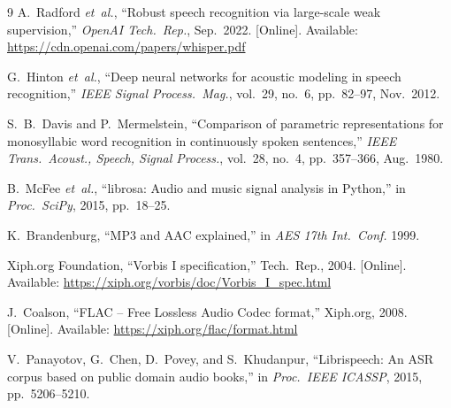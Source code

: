 \documentclass[twocolumn,10pt,a4paper]{article}
\begin{document}
\begin{thebibliography}{9}
A.~Radford \emph{et~al.}, ``Robust speech recognition via large-scale
weak supervision,'' \emph{OpenAI Tech.\ Rep.}, Sep.\ 2022.
[Online]. Available: \url{https://cdn.openai.com/papers/whisper.pdf}

G.~Hinton \emph{et~al.}, ``Deep neural networks for acoustic modeling in
speech recognition,'' \emph{IEEE Signal Process.\ Mag.}, vol.~29,
no.~6, pp.~82--97, Nov.\ 2012.

S.~B.~Davis and P.~Mermelstein, ``Comparison of parametric
representations for monosyllabic word recognition in continuously
spoken sentences,'' \emph{IEEE Trans.\ Acoust., Speech, Signal
Process.}, vol.~28, no.~4, pp.~357--366, Aug.\ 1980.

B.~McFee \emph{et~al.}, ``librosa: Audio and music signal analysis in
Python,'' in \emph{Proc.\ SciPy}, 2015, pp.~18--25.

K.~Brandenburg, ``MP3 and AAC explained,'' in \emph{AES 17th Int.\ Conf.}
1999.

Xiph.org Foundation, ``Vorbis I specification,'' Tech.\ Rep., 2004.
[Online]. Available: \url{https://xiph.org/vorbis/doc/Vorbis_I_spec.html}

J.~Coalson, ``FLAC -- Free Lossless Audio Codec format,'' Xiph.org,
2008. [Online]. Available: \url{https://xiph.org/flac/format.html}

V.~Panayotov, G.~Chen, D.~Povey, and S.~Khudanpur, ``Librispeech: An
ASR corpus based on public domain audio books,'' in \emph{Proc.\ IEEE
ICASSP}, 2015, pp.~5206--5210.
\end{thebibliography}
\end{document}
